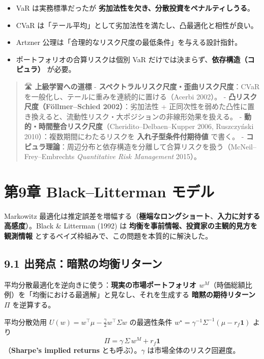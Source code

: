 \documentclass[11pt,a4paper]{report}
\begin{document}
\begin{itemize}
\item VaR は実務標準だったが \textbf{劣加法性を欠き、分散投資をペナルティしうる}。
\item CVaR は「テール平均」として劣加法性を満たし、凸最適化と相性が良い。
\item Artzner 公理は「合理的なリスク尺度の最低条件」を与える設計指針。
\item ポートフォリオの合算リスクは個別 VaR だけでは決まらず、\textbf{依存構造（コピュラ）} が必要。
\end{itemize}

\begin{quote}
🛣 \textbf{上級学習への道標}
- \textbf{スペクトラルリスク尺度・歪曲リスク尺度}：CVaR を一般化し、テールに重みを連続的に置ける（Acerbi 2002）。
- \textbf{凸リスク尺度（Föllmer–Schied 2002）}：劣加法性 + 正同次性を弱めた凸性に置き換えると、流動性リスク・大ポジションの非線形効果を扱える。
- \textbf{動的・時間整合リスク尺度}（Cheridito–Delbaen–Kupper 2006, Ruszczyński 2010）：複数期間にわたるリスクを \textbf{入れ子型条件付期待値} で書く。
- \textbf{コピュラ理論}：周辺分布と依存構造を分離して合算リスクを扱う（McNeil–Frey–Embrechts \emph{Quantitative Risk Management} 2015）。
\end{quote}

\noindent\hrulefill

\chapter{第9章 Black–Litterman モデル}

Markowitz 最適化は推定誤差を増幅する（\textbf{極端なロングショート}、\textbf{入力に対する高感度}）。Black \& Litterman (1992) は \textbf{均衡を事前情報、投資家の主観的見方を観測情報} とするベイズ枠組みで、この問題を本質的に解決した。

\section{9.1 出発点：暗黙の均衡リターン}

平均分散最適化を逆向きに使う：\textbf{現実の市場ポートフォリオ $w^M$}（時価総額比例）を「均衡における最適解」と見なし、それを生成する \textbf{暗黙の期待リターン} $\Pi$ を逆算する。

平均分散効用 $U(w) = w^\top\mu - \tfrac{\gamma}{2} w^\top \Sigma w$ の最適性条件 $w^\star = \gamma^{-1} \Sigma^{-1} (\mu - r_f\mathbf{1})$ より \[ \boxed{\; \Pi = \gamma\, \Sigma\, w^M + r_f \mathbf{1} \;} \] （\textbf{Sharpe’s implied returns} とも呼ぶ）。$\gamma$ は市場全体のリスク回避度。
\end{document}
